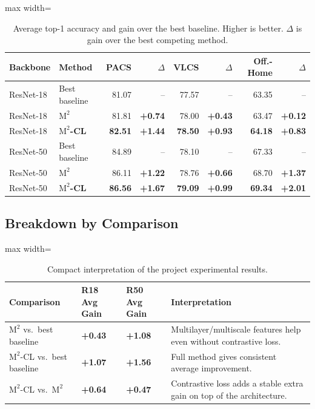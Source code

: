 \documentclass[11pt,a4paper]{article}
\newcommand{\method}{\texorpdfstring{$\mathrm{M}^2$\textup{-CL}}{M2-CL}}
\newcommand{\base}{\texorpdfstring{$\mathrm{M}^2$}{M2}}
\newcommand{\pos}[1]{\textcolor{green!55!black}{\textbf{+#1}}}
\begin{document}
\begin{table}[H]
\centering
\caption{Average top-1 accuracy and gain over the best baseline.
  Higher is better. $\Delta$ is gain over the best competing method.}
\label{tab:summary_results}
\small
\begin{adjustbox}{max width=\textwidth}
\begin{tabular}{llrrrrrr}
\toprule
\rowcolor{headerblue}
Backbone   & Method              & PACS  & $\Delta$ & VLCS  & $\Delta$ & Off.-Home & $\Delta$ \\
\midrule
ResNet-18  & Best baseline       & 81.07 & --       & 77.57 & --       & 63.35     & --       \\
ResNet-18  & \base{}             & 81.81 & \pos{0.74} & 78.00 & \pos{0.43} & 63.47 & \pos{0.12} \\
\rowcolor{lightgreen}
ResNet-18  & \textbf{\method{}}  & \textbf{82.51} & \textbf{\pos{1.44}} &
                                   \textbf{78.50} & \textbf{\pos{0.93}} &
                                   \textbf{64.18} & \textbf{\pos{0.83}} \\
\midrule
ResNet-50  & Best baseline       & 84.89 & --       & 78.10 & --       & 67.33     & --       \\
ResNet-50  & \base{}             & 86.11 & \pos{1.22} & 78.76 & \pos{0.66} & 68.70 & \pos{1.37} \\
\rowcolor{lightgreen}
ResNet-50  & \textbf{\method{}}  & \textbf{86.56} & \textbf{\pos{1.67}} &
                                   \textbf{79.09} & \textbf{\pos{0.99}} &
                                   \textbf{69.34} & \textbf{\pos{2.01}} \\
\bottomrule
\end{tabular}
\end{adjustbox}
\end{table}

\subsection{Breakdown by Comparison}

\begin{table}[H]
\centering
\caption{Compact interpretation of the project experimental results.}
\label{tab:result_interpretation}
\small
\begin{adjustbox}{max width=\textwidth}
\begin{tabular}{llll}
\toprule
\rowcolor{headerblue}
Comparison & R18 Avg Gain & R50 Avg Gain & Interpretation \\
\midrule
\base{} vs.\ best baseline  & \pos{0.43} & \pos{1.08} & Multilayer/multiscale features help even without contrastive loss. \\
\method{} vs.\ best baseline & \textbf{\pos{1.07}} & \textbf{\pos{1.56}} & Full method gives consistent average improvement. \\
\method{} vs.\ \base{}       & \pos{0.64} & \pos{0.47} & Contrastive loss adds a stable extra gain on top of the architecture. \\
\bottomrule
\end{tabular}
\end{adjustbox}
\end{table}
\end{document}
